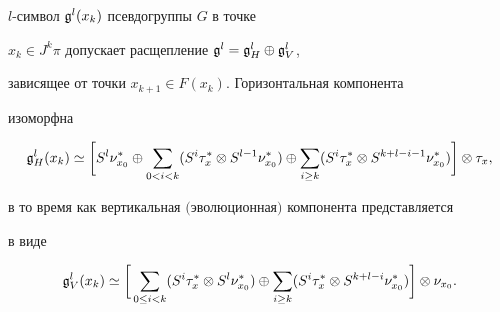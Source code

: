 \begin{prop}\label{proppre}


$l$-символ ${\frak g}^l(x_k)$ псевдогруппы $G$ в точке


$x_k\in J^k\pi$ допускает расщепление ${\frak g}^l={\frak g}^l_H\oplus{\frak g}^l_V$,


зависящее от точки $x_{k+1}\in F(x_k)$. Горизонтальная компонента


изоморфна


$$


\g^l_H(x_k)\simeq


\bigg[S^l\nu_{x_0}^*\oplus\sum_{0<i<k}(S^i\tau_x^*\ot


S^{l-1}\nu_{x_0}^*)\oplus\sum_{i\ge k}(S^i\tau_x^*\ot


S^{k+l-i-1}\nu_{x_0}^*)\bigg]\ot\tau_x,


$$


в то время как вертикальная $($эволюционная$)$ компонента представляется


в виде


$$


\g^l_V(x_k)\simeq \bigg[\sum_{0\le i<k}(S^i\tau_x^*\ot


S^l\nu_{x_0}^*)\oplus\sum_{i\ge k}(S^i\tau_x^*\ot


S^{k+l-i}\nu_{x_0}^*)\bigg]\ot\nu_{x_0}.


$$


\end{prop}





